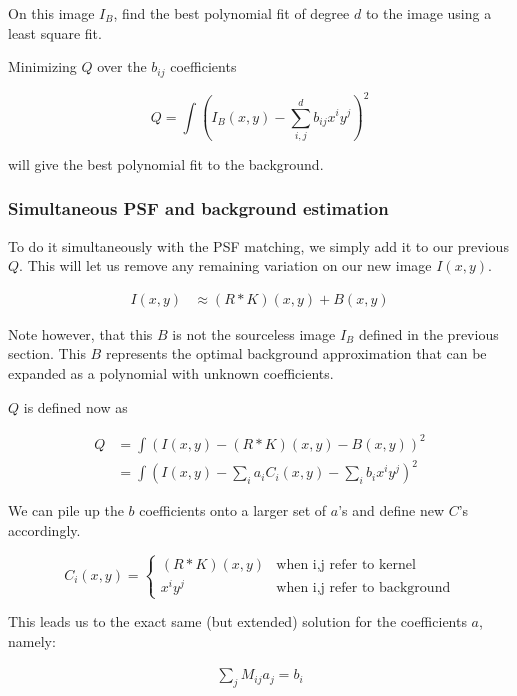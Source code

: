 On this image $I_{B}$, find the best polynomial fit of degree $d$ to the image using a least square fit.

Minimizing $Q$ over the $b_{ij}$ coefficients

\begin{equation}
Q = \int \left( I_{B}(x,y) - \sum_{i,j}^d b_{ij} x^i y^j \right) ^2
\end{equation}

will give the best polynomial fit to the background.

\subsubsection*{Simultaneous PSF and background estimation}

To do it simultaneously with the PSF matching, we simply add it to our previous $Q$. This will let us remove any remaining variation on our new image $I(x,y)$.

\begin{align}
I(x,y) & \approx (R \mathbin{*} K)(x,y) + B(x,y) 
\end{align}

Note however, that this $B$ is not the sourceless image $I_{B}$ defined in the previous section. This $B$ represents the optimal background approximation that can be expanded as a polynomial with unknown coefficients.

$Q$ is defined now as

\begin{align}
Q &= \int \left( I(x,y) - (R \mathbin{*} K)(x,y) - B(x,y) \right)^2 \\
 & = \int \left( I(x,y) - \sum_{i} a_{i} C_{i}(x,y) - \sum_{i} b_{i} x^i y^j \right)^2
\end{align}

We can pile up the $b$ coefficients onto a larger set of $a$'s and define new $C$'s accordingly.

\begin{equation}
C_{i}(x,y)  = \begin{cases} 
(R \mathbin{*} K)(x,y)  &\mbox{when i,j refer to kernel}  \\ 
x^i y^j & \mbox{when i,j refer to background}  
\end{cases} 
\end{equation}

This leads us to the exact same (but extended) solution for the coefficients $a$, namely:

\begin{align}
\sum_{j} M_{ij} a_{j}  =  b_{i}
\end{align}


